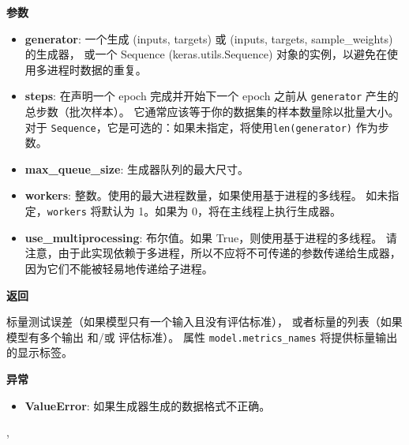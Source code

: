 \textbf{参数}

\begin{itemize}
\tightlist
\item
  \textbf{generator}: 一个生成 (inputs, targets) 或 (inputs, targets,
  sample\_weights) 的生成器， 或一个 Sequence (keras.utils.Sequence)
  对象的实例，以避免在使用多进程时数据的重复。
\item
  \textbf{steps}: 在声明一个 epoch 完成并开始下一个 epoch 之前从
  \texttt{generator} 产生的总步数（批次样本）。
  它通常应该等于你的数据集的样本数量除以批量大小。 对于
  \texttt{Sequence}，它是可选的：如果未指定，将使用\texttt{len(generator)}
  作为步数。
\item
  \textbf{max\_queue\_size}: 生成器队列的最大尺寸。
\item
  \textbf{workers}: 整数。使用的最大进程数量，如果使用基于进程的多线程。
  如未指定，\texttt{workers} 将默认为 1。如果为
  0，将在主线程上执行生成器。
\item
  \textbf{use\_multiprocessing}: 布尔值。如果
  True，则使用基于进程的多线程。
  请注意，由于此实现依赖于多进程，所以不应将不可传递的参数传递给生成器，因为它们不能被轻易地传递给子进程。
\end{itemize}

\textbf{返回}

标量测试误差（如果模型只有一个输入且没有评估标准），
或者标量的列表（如果模型有多个输出 和/或 评估标准）。 属性
\texttt{model.metrics\_names} 将提供标量输出的显示标签。

\textbf{异常}

\begin{itemize}
\tightlist
\item
  \textbf{ValueError}: 如果生成器生成的数据格式不正确。
\end{itemize}



\label{predictux5fgenerator}

\begin{Shaded}
\begin{Highlighting}[]
\OperatorTok{=}\OperatorTok{=}\OperatorTok{=}, \\
\hspace{2.5cm}\OperatorTok{=}\OperatorTok{=}\NormalTok{)}
\end{Highlighting}
\end{Shaded}

